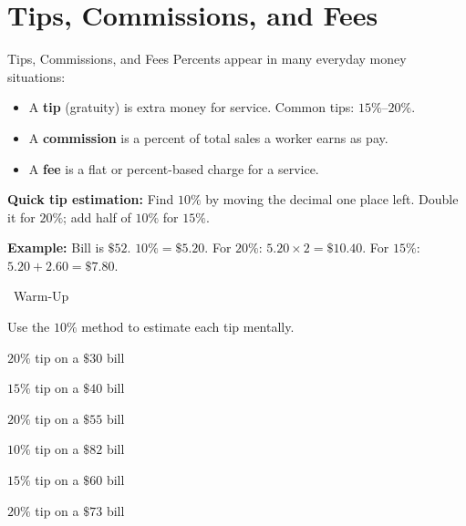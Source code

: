 \section{Tips, Commissions, and Fees}

\begin{quickReview}{Tips, Commissions, and Fees}
Percents appear in many everyday money situations:
\begin{itemize}[leftmargin=*]
    \item A \textbf{tip} (gratuity) is extra money for service. Common tips: $15\%$--$20\%$.
    \item A \textbf{commission} is a percent of total sales a worker earns as pay.
    \item A \textbf{fee} is a flat or percent-based charge for a service.
\end{itemize}

\medskip
\textbf{Quick tip estimation:} Find $10\%$ by moving the decimal one place left. Double it for $20\%$; add half of $10\%$ for $15\%$.

\smallskip
\textbf{Example:} Bill is $\$52$. $10\% = \$5.20$. For $20\%$: $5.20 \times 2 = \$10.40$. For $15\%$: $5.20 + 2.60 = \$7.80$.
\end{quickReview}

\begin{practiceBox}[funGreen]{\faSun~Warm-Up}

Use the $10\%$ method to estimate each tip mentally.

\begin{multicols}{2}
\prob $20\%$ tip on a $\$30$ bill \answerBlank[3cm]

\prob $15\%$ tip on a $\$40$ bill \answerBlank[3cm]

\prob $20\%$ tip on a $\$55$ bill \answerBlank[3cm]

\prob $10\%$ tip on a $\$82$ bill \answerBlank[3cm]

\prob $15\%$ tip on a $\$60$ bill \answerBlank[3cm]

\prob $20\%$ tip on a $\$73$ bill \answerBlank[3cm]
\end{multicols}
\end{practiceBox}

